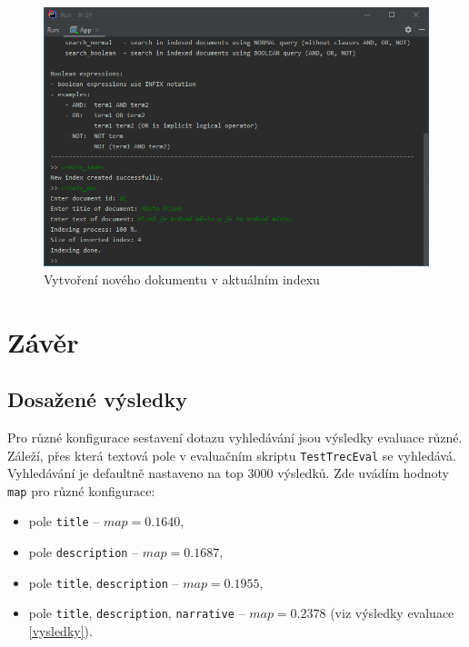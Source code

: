 \documentclass[
11pt,
a4paper,
pdftex,
czech,
titlepage
]{report}
\begin{document}
\begin{figure}[!ht]
	\centering
	\includegraphics[width=1\textwidth]{img/vytvoreni.png}
	\caption{Vytvoření nového dokumentu v aktuálním indexu}
	\label{uziv_vytvor}
\end{figure}


\chapter{Závěr}
\section{Dosažené výsledky}
Pro různé konfigurace sestavení dotazu vyhledávání jsou výsledky evaluace různé. Záleží, přes která textová pole v evaluačním skriptu \texttt{TestTrecEval} se vyhledává. Vyhledávání je defaultně nastaveno na top $3000$ výsledků. Zde uvádím hodnoty \texttt{map} pro různé konfigurace:

\begin{itemize}
    \item pole \texttt{title} -- $map = 0.1640$,
    \item pole \texttt{description} -- $map = 0.1687$,
    \item pole \texttt{title}, \texttt{description} -- $map = 0.1955$,
    \item pole \texttt{title}, \texttt{description}, \texttt{narrative} -- $map = 0.2378$ (viz výsledky evaluace \ref{vysledky}).
\end{itemize}
\end{document}
